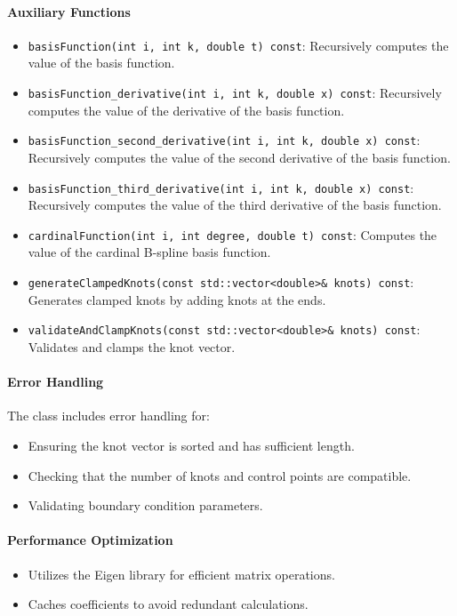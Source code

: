 \documentclass[a4paper]{article}
\begin{document}
\begin{sloppypar}
\paragraph*{Auxiliary Functions}
\begin{itemize}
  \item \verb|basisFunction(int i, int k, double t) const|: Recursively computes the value of the basis function.
  \item \verb|basisFunction_derivative(int i, int k, double x) const|: Recursively computes the value of the derivative of the basis function.
  \item \verb|basisFunction_second_derivative(int i, int k, double x) const|: Recursively computes the value of the second derivative of the basis function.
  \item \verb|basisFunction_third_derivative(int i, int k, double x) const|: Recursively computes the value of the third derivative of the basis function.
  \item \verb|cardinalFunction(int i, int degree, double t) const|: Computes the value of the cardinal B-spline basis function.
  \item \verb|generateClampedKnots(const std::vector<double>& knots) const|: Generates clamped knots by adding knots at the ends.
  \item \verb|validateAndClampKnots(const std::vector<double>& knots) const|: Validates and clamps the knot vector.
\end{itemize}

\paragraph*{Error Handling}
The class includes error handling for:
\begin{itemize}
  \item Ensuring the knot vector is sorted and has sufficient length.
  \item Checking that the number of knots and control points are compatible.
  \item Validating boundary condition parameters.
\end{itemize}

\paragraph*{Performance Optimization}
\begin{itemize}
  \item Utilizes the Eigen library for efficient matrix operations.
  \item Caches coefficients to avoid redundant calculations.
\end{itemize}


\end{sloppypar}
\end{document}
